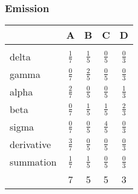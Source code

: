\documentclass{article}
\begin{document}
\subsubsection{Emission}

\small
\begin{center}
\begin{tabular}{l|| c c c c}
\hline\hline
& 	A&	B&	C&	D	\\
\hline\hline
\\
delta&		\(\frac{1}{7}\)&	\(\frac{1}{5}\)&	\(\frac{0}{5}\)&	\(\frac{0}{3}\)\\[1ex]
gamma&		\(\frac{0}{7}\)&	\(\frac{2}{5}\)&	\(\frac{0}{5}\)&	\(\frac{0}{3}\)\\[1ex]
alpha&		\(\frac{2}{7}\)& 	\(\frac{0}{5}\)&	\(\frac{0}{5}\)&	\(\frac{1}{3}\)\\[1ex]
beta&		\(\frac{0}{7}\)&	\(\frac{1}{5}\)&	\(\frac{1}{5}\)&	\(\frac{2}{3}\)\\[1ex]
sigma&		\(\frac{0}{7}\)&	\(\frac{0}{5}\)&	\(\frac{4}{5}\)&	\(\frac{0}{3}\)\\[1ex]
derivative& 	\(\frac{3}{7}\)&	\(\frac{0}{5}\)&	\(\frac{0}{5}\)&	\(\frac{0}{3}\)\\[1ex]
summation&	\(\frac{1}{7}\)&	\(\frac{1}{5}\)&	\(\frac{0}{5}\)&	\(\frac{0}{3}\)\\[1ex]
		&7	&5	&5	&3\\
\hline
\end{tabular}
\end{center}
\end{document}
